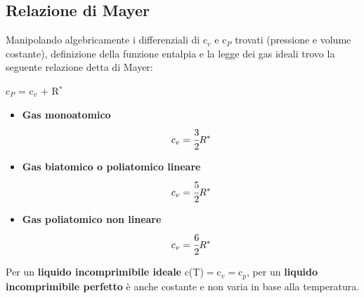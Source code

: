 \documentclass[a4paper,12pt,titlepage]{article}
\begin{document}
\subsection{Relazione di Mayer}
Manipolando algebricamente i differenziali di c$_{v}$ e c$_{P}$ trovati (pressione e volume costante), definizione della funzione entalpia e la legge dei gas ideali trovo la seguente relazione detta di Mayer:
\begin{center}
c$_{P}$ = c$_{v}$ + R$^{*}$
\end{center}
\begin{itemize}
\item \textbf{Gas monoatomico} $$c_{v} = \cfrac{3}{2}R^{*}$$
\item \textbf{Gas biatomico o poliatomico lineare} $$c_{v} = \cfrac{5}{2}R^{*}$$
\item  \textbf{Gas poliatomico non lineare} $$c_{v} = \cfrac{6}{2}R^{*}$$
\end{itemize}
Per un \textbf{liquido incomprimibile ideale}  c(T)$ = $c$_{v} = $c$_{p}$, per un \textbf{liquido incomprimibile perfetto} è anche costante e non varia in base alla temperatura.
\end{document}
